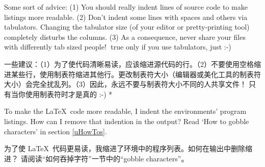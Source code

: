 \begin{advise}
\begin{paracol}{2}
\item Some sort of advice: (1) You should really indent lines of source code
      to make listings more readable. (2) Don't indent some lines with
      spaces and others via tabulators. Changing the tabulator size (of your
      editor or pretty-printing tool) completely disturbs the columns.
      (3) As a consequence, never share your files with differently tab sized
      people!^^A true only if you use tabulators, just :-)
\switchcolumn \item 一些建议：（1）为了使代码清晰易读，应该缩进源代码的行。（2）不要使用空格缩进某些行，使用制表符缩进其他行。更改制表符大小（编辑器或美化工具的制表符大小）会完全扰乱列。（3）因此，永远不要与制表符大小不同的人共享文件！^^A只有当你使用制表符时才是真的 :-)
\switchcolumn[0]*%
\item To make the \LaTeX\ code more readable, I indent the environments'
      program listings. How can I remove that indention in the output?
      \advisespace
      Read `How to gobble characters' in section \ref{uHowTos}.
\switchcolumn
\item 为了使 \LaTeX\ 代码更易读，我缩进了环境中的程序列表。如何在输出中删除缩进？
\advisespace
请阅读“如何吞掉字符”一节中的“gobble characters”。
    \end{paracol}
\end{advise}

